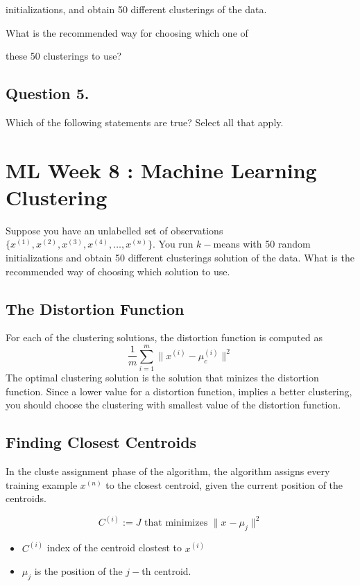 initializations, and obtain 50 different clusterings of the data. 

What is the recommended way for choosing which one of

these 50 clusterings to use?

\subsection*{Question 5. }
Which of the following statements are true? Select all that apply.


\newpage
\section{ML Week 8 : Machine Learning Clustering}

Suppose you have an unlabelled set of observations$\{ x^{(1)},x^{(2)},x^{(3)},x^{(4)}, \ldots ,x^{(n)}\}$.
You run $k-$means with 50 random initializations and obtain 50 different clusterings solution of the data.
What is the recommended way of choosing which solution to use.

\subsection{The Distortion Function}
For each of the clustering solutions, the distortion function is computed as 
\[ \frac{1}{m} \sum^{m}_{i=1} \parallel x^{(i)} - \mu_c^{(i)}\parallel ^2 \]
The optimal clustering solution is the solution that minizes the distortion function.
Since a lower value for a distortion function, implies a better clustering, you should choose the clustering with 
smallest value of the distortion function.




\subsection*{Finding Closest Centroids}

In the cluste assignment phase of the algorithm, the algorithm assigns every training example $x^{(n)}$ to the closest 
centroid, given the current position of the centroids.

\[ C^{(i)} := J \mbox{ that minimizes } \| x^{} - \mu_j \| ^2 \]

\begin{itemize}
\item $C^{(i)}$ index of the centroid clostest to $x^{(i)}$
\item $\mu_j$ is the position of the $j-$th centroid.
\end{itemize}

